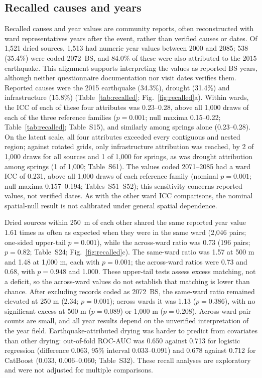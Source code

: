 \documentclass[preprint,12pt,authoryear]{elsarticle}
\newcommand{\auc}{ROC-AUC}
\begin{document}
\subsection{Recalled causes and years}\label{sec:res-recall}
Recalled causes and year values are community reports, often reconstructed with ward representatives years after the event, rather than verified causes or dates. Of 1,521 dried sources, 1,513 had numeric year values between 2000 and 2085; 538 (35.4\%) were coded 2072~BS, and 84.0\% of these were also attributed to the 2015 earthquake. This alignment supports interpreting the values as reported BS years, although neither questionnaire documentation nor visit dates verifies them. Reported causes were the 2015 earthquake (34.3\%), drought (31.4\%) and infrastructure (15.8\%) (Table~\ref{tab:recalled}; Fig.~\ref{fig:recalled}a). Within wards, the ICC of each of these four attributes was 0.23--0.28, above all 1,000 draws of each of the three reference families ($p = 0.001$; null maxima 0.15--0.22; Table~\ref{tab:recalled}; Table~S15), and similarly among springs alone (0.23--0.28). On the latent scale, all four attributes exceeded every contiguous and nested region; against rotated grids, only infrastructure attribution was reached, by 2 of 1,000 draws for all sources and 1 of 1,000 for springs, as was drought attribution among springs (1 of 1,000; Table~S61). The values coded 2071--2085 had a ward ICC of 0.231, above all 1,000 draws of each reference family (nominal $p = 0.001$; null maxima 0.157--0.194; Tables~S51--S52); this sensitivity concerns reported values, not verified dates. As with the other ward ICC comparisons, the nominal spatial-null result is not calibrated under general spatial dependence.

Dried sources within \SI{250}{\metre} of each other shared the same reported year value 1.61 times as often as expected when they were in the same ward (2,046 pairs; one-sided upper-tail $p = 0.001$), while the across-ward ratio was 0.73 (196 pairs; $p = 0.82$; Table~S24; Fig.~\ref{fig:recalled}c). The same-ward ratio was 1.57 at 500 m and 1.48 at 1,000 m, each with $p = 0.001$; the across-ward ratios were 0.73 and 0.68, with $p = 0.948$ and 1.000. These upper-tail tests assess excess matching, not a deficit, so the across-ward values do not establish that matching is lower than chance. After excluding records coded as 2072~BS, the same-ward ratio remained elevated at 250 m (2.34; $p = 0.001$); across wards it was 1.13 ($p = 0.386$), with no significant excess at 500 m ($p = 0.089$) or 1,000 m ($p = 0.208$). Across-ward pair counts are small, and all year results depend on the unverified interpretation of the year field. Earthquake-attributed drying was harder to predict from covariates than other drying: out-of-fold \auc{} was 0.650 against 0.713 for logistic regression (difference 0.063, 95\% interval 0.033--0.091) and 0.678 against 0.712 for CatBoost (0.033, 0.006--0.060; Table~S32). These recall analyses are exploratory and were not adjusted for multiple comparisons.
\end{document}
